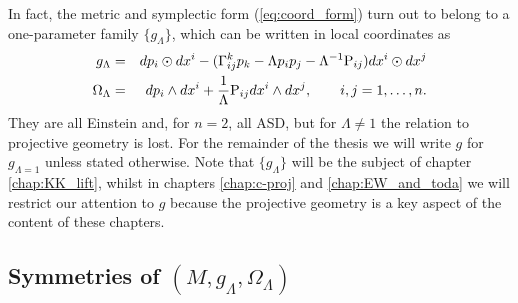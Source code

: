 







In fact, the metric and symplectic form (\ref{eq:coord_form}) turn
out to belong to a one-parameter family $\{g_{\Lambda}\}$, which
can be written in local coordinates as 
\begin{eqnarray}
g_{\Lambda} & = &  dp_{i}\odot dx^{i}-(\Gamma_{ij}^{k}p_{k}-\Lambda p_{i}p_{j}-\Lambda^{-1}\mathrm{P}_{ij}) dx^{i}\odot dx^{j}\label{eq:general_g}\\
\Omega_{\Lambda} & = &  dp_{i}\wedge dx^{i}+\frac{1}{\Lambda}\mathrm{P}_{ij} dx^{i}\wedge dx^{j},\qquad i,j=1,\dots ,n.\label{eq:general_omega}
\end{eqnarray}
They are all Einstein and, for $n=2$, all ASD, but for $\Lambda\neq1$ the relation to projective geometry is lost. For the remainder of the thesis we will write $g$ for $g_{\Lambda=1}$ unless stated otherwise. Note that $\{g_\Lambda\}$ will be the subject of chapter \ref{chap:KK_lift}, whilst in chapters \ref{chap:c-proj} and \ref{chap:EW_and_toda} we will restrict our attention to $g$ because the projective geometry is a key aspect of the content of these chapters.


\subsection{Symmetries of $(M,g_{\Lambda},\Omega_{\Lambda})$}

